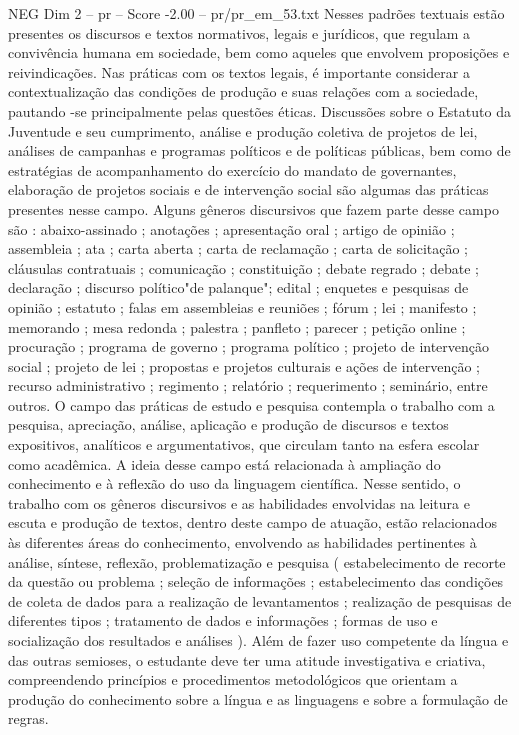 \begin{textsample}{NEG Dim 2 – pr – Score -2.00 – pr/pr\_em\_53.txt}
Nesses padrões textuais estão presentes os discursos e textos normativos, legais e jurídicos, que regulam a convivência humana em sociedade, bem como aqueles que envolvem proposições e reivindicações.
Nas práticas com os textos legais, é importante considerar a contextualização das condições de produção e suas relações com a sociedade, pautando -se principalmente pelas questões éticas.
Discussões sobre o Estatuto da Juventude e seu cumprimento, análise e produção coletiva de projetos de lei, análises de campanhas e programas políticos e de políticas públicas, bem como de estratégias de acompanhamento do exercício do mandato de governantes, elaboração de projetos sociais e de intervenção social são algumas das práticas presentes nesse campo.
Alguns gêneros discursivos que fazem parte desse campo são : abaixo-assinado ; anotações ; apresentação oral ; artigo de opinião ; assembleia ; ata ; carta aberta ; carta de reclamação ; carta de solicitação ; cláusulas contratuais ; comunicação ; constituição ; debate regrado ; debate ; declaração ; discurso político"de palanque"; edital ; enquetes e pesquisas de opinião ; estatuto ; falas em assembleias e reuniões ; fórum ; lei ; manifesto ; memorando ; mesa redonda ; palestra ; panfleto ; parecer ; petição online ; procuração ; programa de governo ; programa político ; projeto de intervenção social ; projeto de lei ; propostas e projetos culturais e ações de intervenção ; recurso administrativo ; regimento ; relatório ; requerimento ; seminário, entre outros.
O campo das práticas de estudo e pesquisa contempla o trabalho com a pesquisa, apreciação, análise, aplicação e produção de discursos e textos expositivos, analíticos e argumentativos, que circulam tanto na esfera escolar como acadêmica.
A ideia desse campo está relacionada à ampliação do conhecimento e à reflexão do uso da linguagem científica.
Nesse sentido, o trabalho com os gêneros discursivos e as habilidades envolvidas na leitura e escuta e produção de textos, dentro deste campo de atuação, estão relacionados às diferentes áreas do conhecimento, envolvendo as habilidades pertinentes à análise, síntese, reflexão, problematização e pesquisa ( estabelecimento de recorte da questão ou problema ; seleção de informações ; estabelecimento das condições de coleta de dados para a realização de levantamentos ; realização de pesquisas de diferentes tipos ; tratamento de dados e informações ; formas de uso e socialização dos resultados e análises ).
Além de fazer uso competente da língua e das outras semioses, o estudante deve ter uma atitude investigativa e criativa, compreendendo princípios e procedimentos metodológicos que orientam a produção do conhecimento sobre a língua e as linguagens e sobre a formulação de regras.

\end{textsample}
